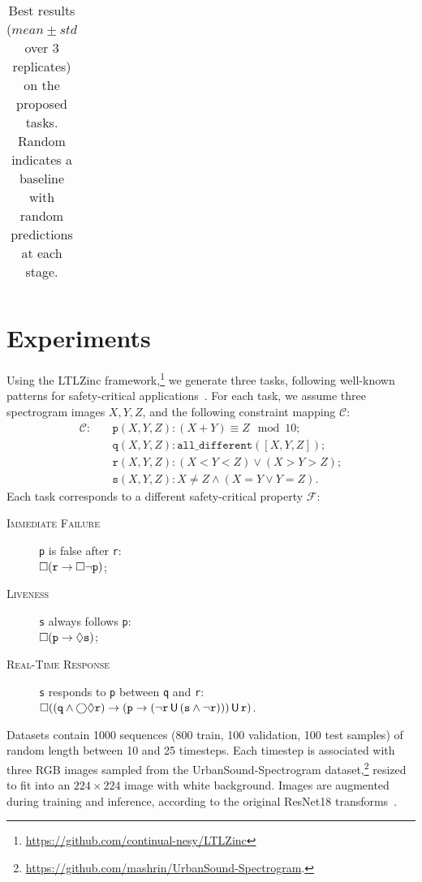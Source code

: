 \begin{table*}[!t]
{\begin{tabular}{cccccccc}
		\bottomrule
	\end{tabular}
	}
\caption[Test set accuracies on LTLZinc-Safety]{Best results ($mean \pm std$ over 3 replicates) on the proposed tasks. Random indicates a baseline with random predictions at each stage.}
\label{ansya:tab:results}
\end{table*}
\fi

\iffalse
\section{Experiments}\label{ansya:sec:experiments}
Using the LTLZinc framework,\footnote{\url{https://github.com/continual-nesy/LTLZinc}} we generate three tasks, following well-known \LTL patterns for safety-critical applications~\cite{dwyer1998property}. For each task, we assume three spectrogram images $X, Y, Z$, %
and the following constraint mapping $\mathcal{C}$:
\begin{align*}
\mathcal{C}\colon\quad&\texttt{p}(X, Y, Z): (X+Y) \equiv Z \mod 10;\\
&\texttt{q}(X, Y, Z): \texttt{all\_different}([X, Y, Z]);\\
&\texttt{r}(X, Y, Z): (X < Y < Z) \vee (X > Y > Z);\\
&\texttt{s}(X, Y, Z): X \not =  Z \wedge (X = Y \vee Y = Z).
\end{align*}
Each task corresponds to a different safety-critical property $\mathcal{F}$:
\begin{description}
\item[\textsc{Immediate Failure}] \texttt{p} is false after \texttt{r}:\\ $\Box (\texttt{r} \rightarrow \Box \neg \texttt{p})$;
\item[\textsc{Liveness}] \texttt{s} always follows \texttt{p}:\\ $\Box (\texttt{p} \rightarrow \Diamond \texttt{s})$;
\item[\textsc{Real-Time Response}] \texttt{s} responds to \texttt{p} between \texttt{q} and \texttt{r}:\\ $\Box ((\texttt{q} \wedge \bigcirc \Diamond \texttt{r}) \rightarrow (\texttt{p} \rightarrow (\neg \texttt{r} \,\mathsf{U}\, (\texttt{s} \wedge \neg \texttt{r}))) \,\mathsf{U}\, \texttt{r})$.
\end{description}
%
Datasets contain 1000 sequences (800 train, 100 validation, 100 test samples) of random length between 10 and 25 timesteps. Each timestep is associated with three RGB images sampled from the UrbanSound-Spectrogram dataset,\footnote{\url{https://github.com/mashrin/UrbanSound-Spectrogram}.} resized to fit into an $224\times 224$ image with white background. Images are augmented during training and inference, according to the original ResNet18 transforms~\cite{he2016deep}.
